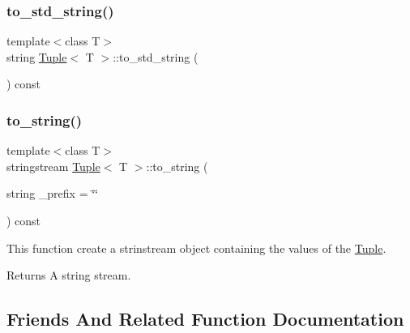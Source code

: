 \mbox{\label{class_tuple_a2c8e5f6fb1abb2b11ab222b7ce772569}} 
\subsubsection{\texorpdfstring{to\_std\_string()}{to\_std\_string()}}
{\footnotesize\ttfamily template$<$class T$>$ \\
string \mbox{\hyperlink{class_tuple}{Tuple}}$<$ T $>$\+::to\+\_\+std\+\_\+string (\begin{DoxyParamCaption}{ }\end{DoxyParamCaption}) const\hspace{0.3cm}{\ttfamily [inline]}}

\mbox{\label{class_tuple_a029b06891c82353ae40c13199830e90a}} 
\subsubsection{\texorpdfstring{to\_string()}{to\_string()}}
{\footnotesize\ttfamily template$<$class T$>$ \\
stringstream \mbox{\hyperlink{class_tuple}{Tuple}}$<$ T $>$\+::to\+\_\+string (\begin{DoxyParamCaption}\item[{string}]{\+\_\+prefix = {\ttfamily \char`\"{}\char`\"{}} }\end{DoxyParamCaption}) const\hspace{0.3cm}{\ttfamily [inline]}}

This function create a strinstream object containing the values of the \mbox{\hyperlink{class_tuple}{Tuple}}. \begin{DoxyReturn}{Returns}
A string stream. 
\end{DoxyReturn}


\subsection{Friends And Related Function Documentation}
\mbox{\label{class_tuple_a2e6e2a2521038ab827ff2aa73023a53d}} 
